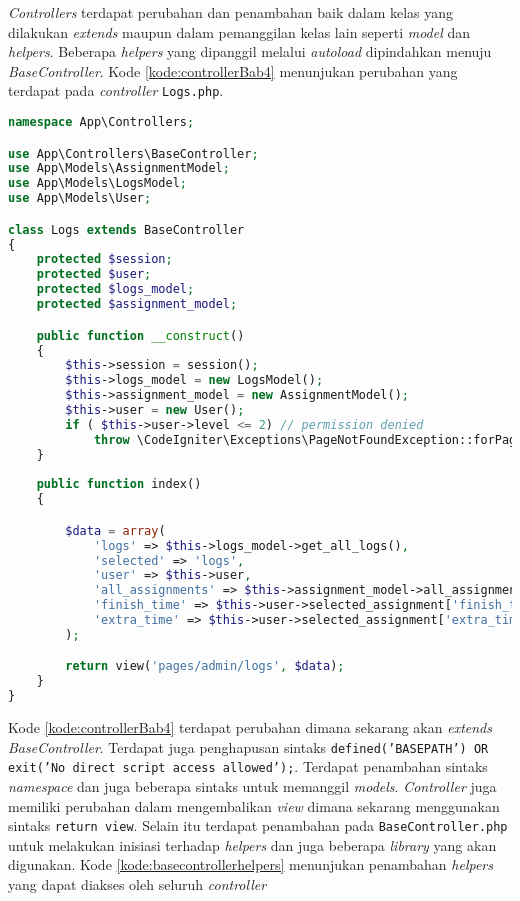 \textit{Controllers} terdapat perubahan dan penambahan baik dalam kelas yang dilakukan \textit{extends} maupun dalam pemanggilan kelas lain seperti \textit{model} dan \textit{helpers}. Beberapa \textit{helpers} yang dipanggil melalui \textit{autoload} dipindahkan menuju \textit{BaseController}. Kode \ref{kode:controllerBab4} menunjukan perubahan yang terdapat pada \textit{controller} \texttt{Logs.php}.

\begin{lstlisting}[language=PHP, caption=Perubahan kode \textit{controller} \texttt{Logs.php} pada \textit{CodeIgniter 4}, label=kode:controllerBab4]
namespace App\Controllers;

use App\Controllers\BaseController;
use App\Models\AssignmentModel;
use App\Models\LogsModel;
use App\Models\User;

class Logs extends BaseController
{
	protected $session;
	protected $user;
	protected $logs_model;
	protected $assignment_model;

	public function __construct()
	{
		$this->session = session();
		$this->logs_model = new LogsModel();
		$this->assignment_model = new AssignmentModel();
		$this->user = new User();
		if ( $this->user->level <= 2) // permission denied
			throw \CodeIgniter\Exceptions\PageNotFoundException::forPageNotFound();
	}
	
	public function index()
	{

		$data = array(
			'logs' => $this->logs_model->get_all_logs(),
			'selected' => 'logs',
			'user' => $this->user,
			'all_assignments' => $this->assignment_model->all_assignments(),
			'finish_time' => $this->user->selected_assignment['finish_time'],
			'extra_time' => $this->user->selected_assignment['extra_time'],
		);

		return view('pages/admin/logs', $data);
	}
}
\end{lstlisting}

Kode \ref{kode:controllerBab4} terdapat perubahan dimana sekarang akan \textit{extends} \textit{BaseController}. Terdapat juga penghapusan sintaks \texttt{defined('BASEPATH') OR exit('No direct script access allowed');}. Terdapat penambahan sintaks \textit{namespace} dan juga beberapa sintaks untuk memanggil \textit{models}. \textit{Controller} juga memiliki perubahan dalam mengembalikan \textit{view} dimana sekarang menggunakan sintaks \texttt{return view}. Selain itu terdapat penambahan pada \texttt{BaseController.php} untuk melakukan inisiasi terhadap \textit{helpers} dan juga beberapa \textit{library} yang akan digunakan. Kode \ref{kode:basecontrollerhelpers} menunjukan penambahan \textit{helpers} yang dapat diakses oleh seluruh \textit{controller}

